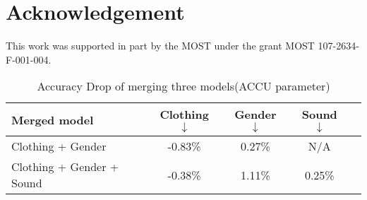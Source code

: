 \documentclass{article}
\begin{document}
	
	
	\section*{Acknowledgement}
	This work was supported in part by the MOST under the grant MOST 107-2634-F-001-004.
	
	
	\begin{table}[t]
		\centering
		\small
		\caption{Accuracy Drop of merging three models(ACCU parameter)}
		\label{MoreMerge}
		\begin{tabular}{lcccc}
			\toprule
			Merged model             & Clothing $\downarrow$ & Gender $\downarrow$  & Sound $\downarrow$                \\ \hline
			Clothing + Gender     & -0.83\%    & 0.27\%   & N/A          \\
			Clothing + Gender + Sound    & -0.38\%    & 1.11\%   & 0.25\%     \\
			\bottomrule
		\end{tabular}
	\end{table}    
	
	
	
	
	
	
	
\end{document}
